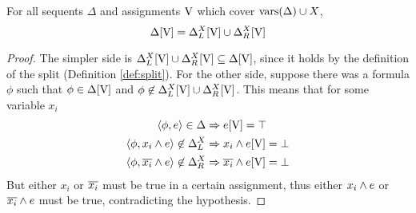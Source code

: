\begin{lemma}
	\label{lemma:cup}
	For all sequents $\Delta$ and assignments $\mathrm{V}$ which cover $\mathrm{vars}(\Delta) \cup X$,
	$$ \Delta[\mathrm{V}] = \Delta_L^X[\mathrm{V}] \cup \Delta_R^X[\mathrm{V}] $$
\end{lemma}
\begin{proof}
	The simpler side is $\Delta_L^X[\mathrm{V}] \cup \Delta_R^X[\mathrm{V}] \subseteq \Delta[\mathrm{V}]$, since it  holds by the definition of the split (Definition \ref{def:split}).
	For the other side, suppose there was a formula $\phi$ such that $\phi \in \Delta[\mathrm{V}]$ and $\phi \not \in \Delta_L^X[\mathrm{V}] \cup \Delta_R^X[\mathrm{V}]$.
	This means that for some variable $x_i$ 
	\begin{align*}
		\langle \phi, e \rangle \in \Delta &\Rightarrow e[\mathrm{V}] = \top \\
		\langle \phi, x_i \wedge e \rangle \not \in \Delta_L^X &\Rightarrow x_i \wedge e[\mathrm{V}] = \bot \\
		\langle \phi, \overline{x_i} \wedge e \rangle \not \in \Delta_R^X &\Rightarrow \overline{x_i} \wedge e[\mathrm{V}] = \bot
	\end{align*}
	But either $x_i$ or $\overline{x_i}$ must be true in a certain assignment, thus either $x_i \wedge e$ or $\overline{x_i} \wedge e$ must be true, contradicting the hypothesis.
\end{proof}

